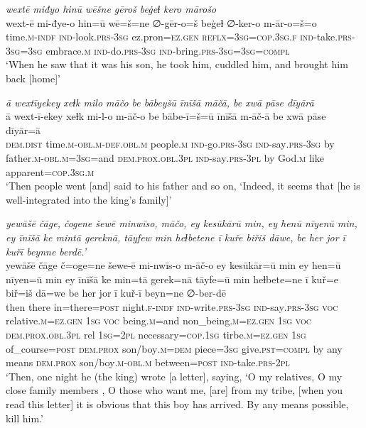 \ea \label{KŠ.32}
\textit{wextē miđyo hinū wēšne gēroš beġeɫ kero mārošo} \\ 
\gll wext-ē mi-đye-o hin=ū wē=š=ne ∅-gēr-o=š beġeɫ ∅-ker-o m-ār-o=š=o \\ 
 time\textsc{.m}\textsc{-indf} \textsc{ind-}look\textsc{.prs}\textsc{-3sg} ez.pron\textsc{=ez.gen} \textsc{reflx}\textsc{=3sg}\textsc{=cop}\textsc{.3sg}\textsc{.f} \textsc{ind-}take\textsc{.prs}\textsc{-3sg}\textsc{=3sg} embrace\textsc{.m} \textsc{ind-}do\textsc{.prs}\textsc{-3sg} \textsc{ind-}bring\textsc{.prs}\textsc{-3sg}\textsc{=3sg}\textsc{=compl} \\ 
\glt `When he saw that it was his son, he took him, cuddled him, and brought him back [home]'
\z 
 
\ea \label{KŠ.46}
\textit{ā wextīyekey xeɫk milo māčo be bābeyšū īnīšā māčā, be xwā pāse dīyārā} \\ 
\gll ā wext-ī-ekey xeɫk mi-l-o m-āč-o be bābe-ī=š=ū īnīšā m-āč-ā be xwā pāse dīyār=ā \\ 
 \textsc{dem.dist} time\textsc{.m}\textsc{-obl}\textsc{.m}\textsc{-def}\textsc{.obl}\textsc{.m} people\textsc{.m} \textsc{ind-}go\textsc{.prs}\textsc{-3sg} \textsc{ind-}say\textsc{.prs}\textsc{-3sg} by father\textsc{.m}\textsc{-obl}\textsc{.m}\textsc{=3sg}=and \textsc{dem.prox}\textsc{.obl}\textsc{.3pl} \textsc{ind-}say\textsc{.prs}\textsc{-3pl} by God\textsc{.m} like apparent\textsc{=cop}\textsc{.3sg}\textsc{.m} \\ 
\glt `Then people went [and] said to his father and so on, ‘Indeed, it seems that [he is well-integrated into the king’s family]'
\z 
 
\ea \label{KŠ.56}
\textit{yewāšē čāge, čogene šewē minwīso, māčo, ey kesūkārū min, ey henū nīyenū min, ey īnīšā ke mintā gereknā, tāyfew min heɫbetene ī kuře biřiš dāwe, be her jor ī kuřī beynne berdē.’} \\ 
\gll yewāšē čāge č=oge=ne šewe-ē mi-nwīs-o m-āč-o ey kesūkār=ū min ey hen=ū nīyen=ū min ey īnīšā ke min=tā gerek=nā tāyfe=ū min heɫbete=ne ī kuř=e biř=iš dā=we be her jor ī kuř-ī beyn=ne ∅-ber-dē \\ 
 then there in=there\textsc{=\textsc{post}} night\textsc{.f}\textsc{-indf} \textsc{ind-}write\textsc{.prs}\textsc{-3sg} \textsc{ind-}say\textsc{.prs}\textsc{-3sg} \textsc{voc} relative\textsc{.m}\textsc{\textsc{=ez.gen}} \textsc{1sg} \textsc{voc} being\textsc{.m}=and non\_being\textsc{.m}\textsc{\textsc{=ez.gen}} \textsc{1sg} \textsc{voc} \textsc{dem.prox}\textsc{.obl}\textsc{.3pl} rel \textsc{1sg}=\textsc{2pl} necessary\textsc{=cop}\textsc{.\textsc{1sg}} tirbe\textsc{.m}\textsc{\textsc{=ez.gen}} \textsc{1sg} of\_course\textsc{=\textsc{post}} \textsc{dem.prox} son/boy\textsc{.m}\textsc{=dem} piece\textsc{=3sg} give\textsc{.pst}\textsc{=compl} by any means \textsc{dem.prox} son/boy\textsc{.m}\textsc{-obl}\textsc{.m} between\textsc{=\textsc{post}} \textsc{ind-}take\textsc{.prs}-\textsc{2pl} \\ 
\glt `Then, one night he (the king) wrote [a letter], saying, ‘O my relatives, O my close family members , O those who want me, [are] from my tribe, [when you read this letter] it is obvious that this boy has arrived. By any means possible, kill him.'
\z 
 
